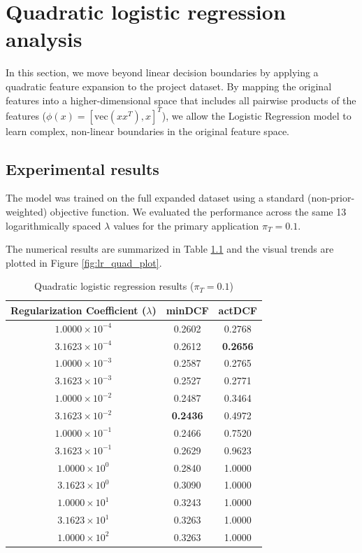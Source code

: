 \chapter{Quadratic logistic regression analysis}

In this section, we move beyond linear decision boundaries by applying a quadratic feature expansion to the project dataset. By mapping the original features into a higher-dimensional space that includes all pairwise products of the features ($\phi(x) = [\text{vec}(xx^T), x]^T$), we allow the Logistic Regression model to learn complex, non-linear boundaries in the original feature space.

\section{Experimental results}

The model was trained on the full expanded dataset using a standard (non-prior-weighted) objective function. We evaluated the performance across the same 13 logarithmically spaced $\lambda$ values for the primary application $\pi_T = 0.1$. 

The numerical results are summarized in Table \ref{tab:quad_lr_results} and the visual trends are plotted in Figure \ref{fig:lr_quad_plot}.

\begin{table}[h]
\centering
\caption{Quadratic logistic regression results ($\pi_T = 0.1$)}
\label{tab:quad_lr_results}
\begin{tabular}{@{}ccc@{}}
\toprule
\textbf{Regularization Coefficient ($\lambda$)} & \textbf{minDCF} & \textbf{actDCF} \\ \midrule
$1.0000 \times 10^{-4}$ & 0.2602 & 0.2768 \\
$3.1623 \times 10^{-4}$ & 0.2612 & \textbf{0.2656} \\
$1.0000 \times 10^{-3}$ & 0.2587 & 0.2765 \\
$3.1623 \times 10^{-3}$ & 0.2527 & 0.2771 \\
$1.0000 \times 10^{-2}$ & 0.2487 & 0.3464 \\
$3.1623 \times 10^{-2}$ & \textbf{0.2436} & 0.4972 \\
$1.0000 \times 10^{-1}$ & 0.2466 & 0.7520 \\
$3.1623 \times 10^{-1}$ & 0.2629 & 0.9623 \\
$1.0000 \times 10^{0}$  & 0.2840 & 1.0000 \\
$3.1623 \times 10^{0}$  & 0.3090 & 1.0000 \\
$1.0000 \times 10^{1}$  & 0.3243 & 1.0000 \\
$3.1623 \times 10^{1}$  & 0.3263 & 1.0000 \\
$1.0000 \times 10^{2}$  & 0.3263 & 1.0000 \\
\bottomrule
\end{tabular}
\end{table}

